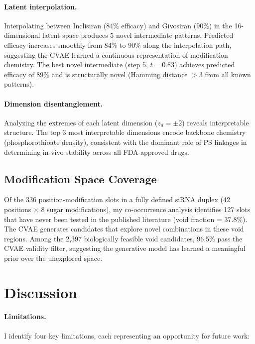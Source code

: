 \documentclass{article}
\begin{document}
\paragraph{Latent interpolation.} Interpolating between Inclisiran ($84\%$ efficacy) and Givosiran ($90\%$) in the 16-dimensional latent space produces 5 novel intermediate patterns. Predicted efficacy increases smoothly from 84\% to 90\% along the interpolation path, suggesting the CVAE learned a continuous representation of modification chemistry. The best novel intermediate (step 5, $t=0.83$) achieves predicted efficacy of 89\% and is structurally novel (Hamming distance $>3$ from all known patterns).

\paragraph{Dimension disentanglement.} Analyzing the extremes of each latent dimension ($z_d = \pm 2$) reveals interpretable structure. The top 3 most interpretable dimensions encode backbone chemistry (phosphorothioate density), consistent with the dominant role of PS linkages in determining in-vivo stability across all FDA-approved drugs.

\subsection{Modification Space Coverage}

Of the 336 position-modification slots in a fully defined siRNA duplex (42 positions $\times$ 8 sugar modifications), my co-occurrence analysis identifies 127 slots that have never been tested in the published literature (void fraction = 37.8\%). The CVAE generates candidates that explore novel combinations in these void regions. Among the 2,397 biologically feasible void candidates, 96.5\% pass the CVAE validity filter, suggesting the generative model has learned a meaningful prior over the unexplored space.


\section{Discussion}

\paragraph{Limitations.}
I identify four key limitations, each representing an opportunity for future work:
\end{document}

